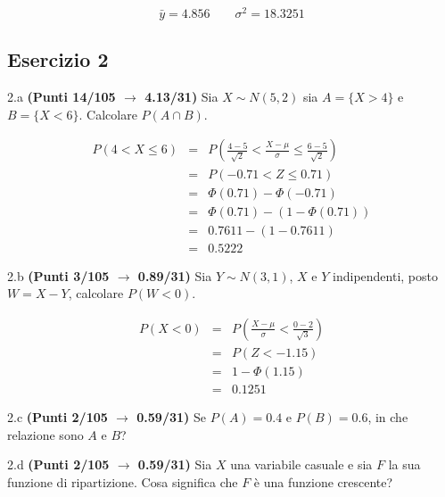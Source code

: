 \documentclass[
  11pt,
]{book}
\theoremstyle{mytheoremstyle}
\theoremstyle{mydefstyle}
\newenvironment{sol}
  {
  \begin{tcolorbox}[enhanced,breakable,arc=0.1mm,boxrule=1pt,colback=white,colframe=iblue,
  title=\bf \fontfamily{lmss}\selectfont \hspace{.5 cm} Soluzione,drop fuzzy shadow]

}{
\end{tcolorbox}
  }
\begin{document}
\begin{sol}
\[
\bar y = 4.856\qquad \sigma^2 = 18.3251
\]

\end{sol}

\subsection{Esercizio 2}\label{esercizio-2-37}

2.a \textbf{(Punti 14/105 \(\rightarrow\) 4.13/31)} Sia \(X\sim N(5,2)\) sia \(A=\{X>4\}\) e \(B=\{X<6\}\). Calcolare \(P(A\cap B)\).

\begin{sol}
\begin{eqnarray*}
   P( 4 < X \leq  6 ) &=& P\left( \frac { 4  -  5 }{\sqrt{ 2 }} < \frac { X  -  \mu }{ \sigma } \leq \frac { 6  -  5 }{\sqrt{ 2 }}\right)  \\
              &=& P\left(  -0.71  < Z \leq  0.71 \right) \\
              &=& \Phi( 0.71 )-\Phi( -0.71 )\\
              &=&  \Phi( 0.71 )-(1-\Phi( 0.71 )) \\ &=&  0.7611 -(1- 0.7611 ) \\ 
              &=&  0.5222 
   \end{eqnarray*}

\end{sol}

2.b \textbf{(Punti 3/105 \(\rightarrow\) 0.89/31)} Sia \(Y\sim N(3,1)\), \(X\) e \(Y\) indipendenti, posto \(W=X-Y\), calcolare \(P(W<0)\).

\begin{sol}
\begin{eqnarray*}
      P( X   <   0 ) 
        &=& P\left(  \frac { X  -  \mu }{ \sigma }  <  \frac { 0  -  2 }{\sqrt{ 3 }} \right)  \\
                 &=& P\left(  Z   <   -1.15 \right) \\    
                 &=&  1-\Phi( 1.15 ) \\ &=&  0.1251 
      \end{eqnarray*}

\end{sol}

2.c \textbf{(Punti 2/105 \(\rightarrow\) 0.59/31)} Se \(P(A)=0.4\) e \(P(B)=0.6\), in che relazione sono \(A\) e \(B\)?

2.d \textbf{(Punti 2/105 \(\rightarrow\) 0.59/31)} Sia \(X\) una variabile casuale e sia \(F\) la sua funzione di ripartizione. Cosa significa che \(F\) è una funzione crescente?
\end{document}
